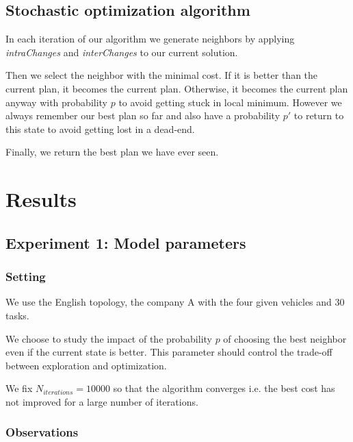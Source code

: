 \documentclass[11pt]{article}
\begin{document}
\subsection{Stochastic optimization algorithm}

In each iteration of our algorithm we generate neighbors by applying \textit{intraChanges} and \textit{interChanges} to our current solution. 

Then we select the neighbor with the minimal cost. If it is better than the current plan, it becomes the current plan. Otherwise, it becomes the current plan anyway with probability $p$ to avoid getting stuck in local minimum. However we always remember our best plan so far and also have a probability $p'$ to return to this state to avoid getting lost in a dead-end.

Finally, we return the best plan we have ever seen.

\section{Results}

\subsection{Experiment 1: Model parameters}

\subsubsection{Setting}

We use the English topology, the company A with the four given vehicles and 30 tasks.

We choose to study the impact of the probability $p$ of choosing the best neighbor even if the current state is better. This parameter should control the trade-off between exploration and optimization.

We fix $N_{iterations} = 10000$ so that the algorithm converges i.e. the best cost has not improved for a large number of iterations.

\subsubsection{Observations}
\end{document}
